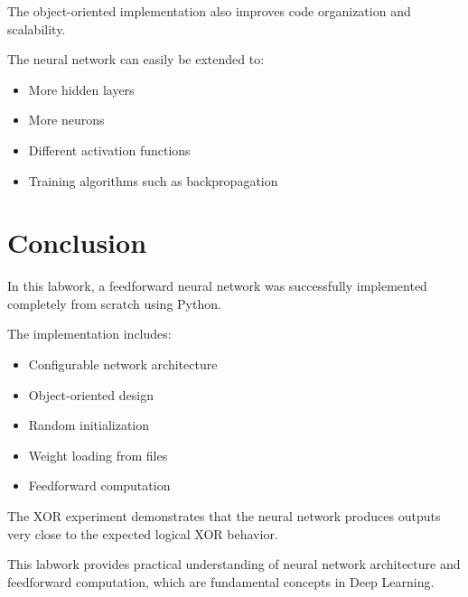 \documentclass[12pt]{article}
\begin{document}
The object-oriented implementation also improves code organization and scalability.

The neural network can easily be extended to:
\begin{itemize}
    \item More hidden layers
    \item More neurons
    \item Different activation functions
    \item Training algorithms such as backpropagation
\end{itemize}

\section{Conclusion}

In this labwork, a feedforward neural network was successfully implemented completely from scratch using Python.

The implementation includes:
\begin{itemize}
    \item Configurable network architecture
    \item Object-oriented design
    \item Random initialization
    \item Weight loading from files
    \item Feedforward computation
\end{itemize}

The XOR experiment demonstrates that the neural network produces outputs very close to the expected logical XOR behavior.

This labwork provides practical understanding of neural network architecture and feedforward computation, which are fundamental concepts in Deep Learning.
\end{document}
